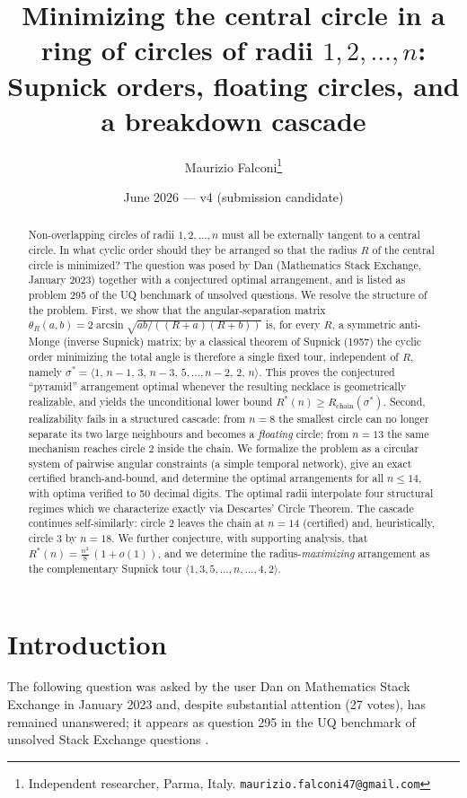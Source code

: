 \documentclass[11pt]{article}
\title{Minimizing the central circle in a ring of circles of radii $1,2,\dots,n$:\\
Supnick orders, floating circles, and a breakdown cascade}
\author{Maurizio Falconi\thanks{Independent researcher, Parma, Italy. \texttt{maurizio.falconi47@gmail.com}}}
\date{June 2026 --- v4 (submission candidate)}
\theoremstyle{definition}
\theoremstyle{remark}
\DeclareMathOperator{\asin}{arcsin}
\begin{document}
\maketitle

\begin{abstract}
Non-overlapping circles of radii $1,2,\dots,n$ must all be externally tangent to a central circle. In what cyclic order should they be arranged so that the radius $R$ of the central circle is minimized? The question was posed by Dan (Mathematics Stack Exchange, January 2023) together with a conjectured optimal arrangement, and is listed as problem 295 of the UQ benchmark of unsolved questions. We resolve the structure of the problem. First, we show that the angular-separation matrix $\theta_R(a,b)=2\asin\sqrt{ab/((R+a)(R+b))}$ is, for every $R$, a symmetric anti-Monge (inverse Supnick) matrix; by a classical theorem of Supnick (1957) the cyclic order minimizing the total angle is therefore a single fixed tour, independent of $R$, namely $\sigma^\ast=\langle 1,\,n-1,\,3,\,n-3,\,5,\dots,n-2,\,2,\,n\rangle$. This proves the conjectured ``pyramid'' arrangement optimal whenever the resulting necklace is geometrically realizable, and yields the unconditional lower bound $R^\ast(n)\ge R_{\mathrm{chain}}(\sigma^\ast)$. Second, realizability fails in a structured cascade: from $n=8$ the smallest circle can no longer separate its two large neighbours and becomes a \emph{floating} circle; from $n=13$ the same mechanism reaches circle $2$ inside the chain. We formalize the problem as a circular system of pairwise angular constraints (a simple temporal network), give an exact certified branch-and-bound, and determine the optimal arrangements for all $n\le 14$, with optima verified to 50 decimal digits. The optimal radii interpolate four structural regimes which we characterize exactly via Descartes' Circle Theorem. The cascade continues self-similarly: circle $2$ leaves the chain at $n=14$ (certified) and, heuristically, circle $3$ by $n=18$. We further conjecture, with supporting analysis, that $R^\ast(n)=\tfrac{n^2}{8}\,(1+o(1))$, and we determine the radius-\emph{maximizing} arrangement as the complementary Supnick tour $\langle 1,3,5,\dots,n,\dots,4,2\rangle$.
\end{abstract}

\section{Introduction}

The following question was asked by the user Dan on Mathematics Stack Exchange in January 2023 \cite{mse} and, despite substantial attention (27 votes), has remained unanswered; it appears as question 295 in the UQ benchmark of unsolved Stack Exchange questions \cite{uq}.
\end{document}
